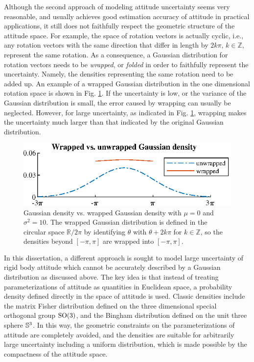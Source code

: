 Although the second approach of modeling attitude uncertainty seems very reasonable, and usually achieves good estimation accuracy of attitude in practical applications, it still does not faithfully respect the geometric structure of the attitude space.
For example, the space of rotation vectors is actually cyclic, i.e., any rotation vectors with the same direction that differ in length by $2k\pi$, $k\in\mathbb{Z}$, represent the same rotation.
As a consequence, a Gaussian distribution for rotation vectors needs to be \textit{wrapped}, or \textit{folded} in order to faithfully represent the uncertainty.
Namely, the densities representing the same rotation need to be added up.
An example of a wrapped Gaussian distribution in the one dimensional rotation space is shown in Fig. \ref{fig:wrapping}.
If the uncertainty is low, or the variance of the Gaussian distribution is small, the error caused by wrapping can usually be neglected.
However, for large uncertainty, as indicated in Fig. \ref{fig:wrapping}, wrapping makes the uncertainty much larger than that indicated by the original Gaussian distribution.

\begin{figure}
	\centering
	\includegraphics[scale=1.2]{figures/wrapping}
	\caption[Gaussian density vs. wrapped Gaussian density.]{Gaussian density vs. wrapped Gaussian density with $\mu=0$ and $\sigma^2=10$.
		The wrapped Gaussian distribution is defined in the circular space $\mathbb{R}/2\pi$ by identifying $\theta$ with $\theta+2k\pi$ for $k\in\mathbb{Z}$, so the densities beyond $[-\pi,\pi]$ are wrapped into $[-\pi,\pi]$. \label{fig:wrapping}}
\end{figure}

In this dissertation, a different approach is sought to model large uncertainty of rigid body attitude which cannot be accurately described by a Gaussian distribution as discussed above.
The key idea is that instead of treating parameterizations of attitude as quantities in Euclidean space, a probability density defined directly in the space of attitude is used.
Classic densities include the matrix Fisher distribution defined on the three dimensional special orthogonal group $\mathrm{SO}(3)$, and the Bingham distribution defined on the unit three sphere $\mathbb{S}^3$.
In this way, the geometric constraints on the parameterizations of attitude are completely avoided, and the densities are suitable for arbitrarily large uncertainty including a uniform distribution, which is made possible by the compactness of the attitude space.

